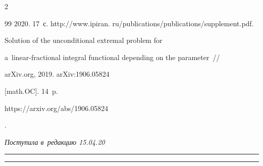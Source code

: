 \begin{multicols}{2}
{{\begin{thebibliography}{99}
2020. 17~с. {\sf http://www.ipiran. ru/publications/publications/supplement.pdf}.


 Solution of the unconditional extremal problem for 

a~linear-fractional integral functional depending on the parameter~// 

arXiv.org, 2019. arXiv:1906.05824 

[math.OC]. 14~p. {\sf 

https://arxiv.org/abs/1906.05824}.

\end{thebibliography}



 }

 }



\end{multicols}



\vspace*{-3pt}



\hfill{\small\textit{Поступила в~редакцию 15.04.20}}



\vspace*{8pt}












\hrule



\vspace*{2pt}



\hrule






\def\tit{SOLUTION OF THE UNCONDITIONAL EXTREMAL PROBLEM 

FOR~A~LINEAR-FRACTIONAL INTEGRAL FUNCTIONAL DEPENDENT ON~THE~PARAMETER}





\def\titkol{Solution of the unconditional extremal problem for 

a~linear-fractional integral functional dependent on the parameter}



